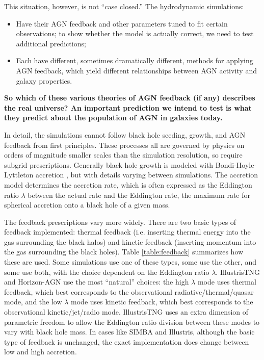 \documentclass[12pt, preprint]{hacked-aastex}
\begin{document}
This situation, however, is not ``case closed.'' The hydrodynamic simulations:
\begin{itemize}
\item Have their AGN feedback and other parameters tuned to fit
certain observations; to show whether the model is actually correct, we need to 
test additional predictions;
\item Each have different, sometimes dramatically different, methods for applying
AGN feedback, which yield different relationships between AGN activity and 
galaxy properties. 
\end{itemize}
{\bf So which of these various theories of AGN feedback (if any) describes
the real universe? An important prediction we intend to test is what they 
predict about the population of AGN in galaxies today.}

In detail, the simulations cannot follow black hole seeding, growth, and AGN feedback
from first principles. These processes all are governed by physics
on orders of magnitude smaller scales than the simulation resolution, so
require subgrid prescriptions.
Generally black hole growth is modeled with 
Bondi-Hoyle-Lyttleton accretion \cite{edgar04a}, but with details varying 
between simulations. The accretion model determines the accretion rate, 
which is often expressed as the Eddington ratio $\lambda$ between 
the actual rate and the Eddington rate, the maximum rate for spherical accretion 
onto a black hole of a given mass.

The feedback prescriptions vary more widely. There are two basic types 
of feedback implemented: thermal feedback (i.e. inserting thermal energy
into the gas surrounding the black halos) and kinetic feedback (inserting
momentum into the gas surrounding the black holes). 
Table \ref{table:feedback} summarizes how these are used. 
Some simulations use 
one of these types, some use the other, and some use both, with the 
choice dependent on the Eddington ratio $\lambda$. IllustrisTNG and 
Horizon-AGN
use the most ``natural'' choices: the high $\lambda$
mode uses thermal feedback, which best corresponds to the 
observational radiative/thermal/quasar mode, and the 
low $\lambda$ mode uses
kinetic feedback, which best corresponds to the observational
kinetic/jet/radio mode. 
IllustrisTNG uses an extra dimension of parametric freedom to 
allow the Eddington ratio division 
between these modes to vary with black hole mass. 
In cases like SIMBA and Illustris,
although the basic type of feedback is unchanged, the exact implementation
does change between low and high accretion.
\end{document}
